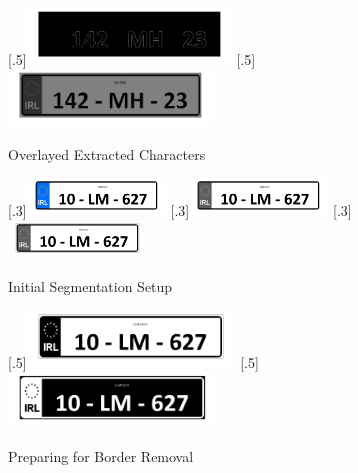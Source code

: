 \documentclass[a4paper]{article}
\begin{document}
	\begin{figure}[H]
		\centering
		[.5\linewidth]{\includegraphics[height=1.5cm]{Results/Q2/NumPlate5/qanumber_plate_5Canny.jpg}}%
		[.5\linewidth]{\includegraphics[height=1.5cm]{Results/Q2/NumPlate5/qanumber_plate_5Overlay.jpg}}%
		\caption{Overlayed Extracted Characters}
		\label{fig:}
	\end{figure}
	\begin{figure}[H]
		\centering
		[.3\linewidth]{\includegraphics[height=1cm]{Results/Q2/NumPlate6/qanumber_plate_6.jpg}}%
		[.3\linewidth]{\includegraphics[height=1cm]{Results/Q2/NumPlate6/qanumber_plate_6Grey.jpg}}%
		[.3\linewidth]{\includegraphics[height=1cm]{Results/Q2/NumPlate6/qanumber_plate_6Low.jpg}}%
		\caption{Initial Segmentation Setup}
		\label{fig:}
	\end{figure}
	\begin{figure}[H]
		\centering
		[.5\linewidth]{\includegraphics[height=1.5cm]{Results/Q2/NumPlate6/qanumber_plate_6Mid.jpg}}%
		[.5\linewidth]{\includegraphics[height=1.5cm]{Results/Q2/NumPlate6/qanumber_plate_6Not.jpg}}%
		\caption{Preparing for Border Removal}
		\label{fig:}
	\end{figure}
\end{document}
